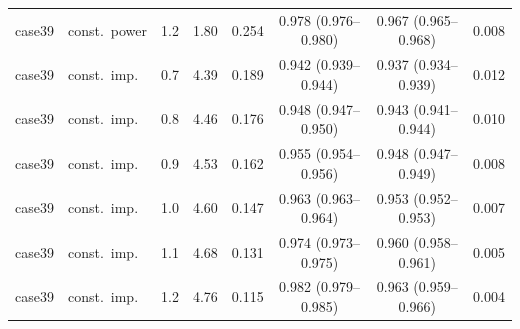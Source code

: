 \begin{longtable}{llcccccc}
case39 & const.\ power & 1.2 & 1.80 & 0.254 & 0.978 (0.976--0.980) & 0.967 (0.965--0.968) & 0.008\\
case39 & const.\ imp. & 0.7 & 4.39 & 0.189 & 0.942 (0.939--0.944) & 0.937 (0.934--0.939) & 0.012\\
case39 & const.\ imp. & 0.8 & 4.46 & 0.176 & 0.948 (0.947--0.950) & 0.943 (0.941--0.944) & 0.010\\
case39 & const.\ imp. & 0.9 & 4.53 & 0.162 & 0.955 (0.954--0.956) & 0.948 (0.947--0.949) & 0.008\\
case39 & const.\ imp. & 1.0 & 4.60 & 0.147 & 0.963 (0.963--0.964) & 0.953 (0.952--0.953) & 0.007\\
case39 & const.\ imp. & 1.1 & 4.68 & 0.131 & 0.974 (0.973--0.975) & 0.960 (0.958--0.961) & 0.005\\
case39 & const.\ imp. & 1.2 & 4.76 & 0.115 & 0.982 (0.979--0.985) & 0.963 (0.959--0.966) & 0.004\\
\bottomrule\end{longtable}
